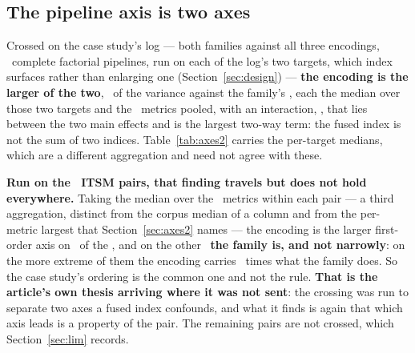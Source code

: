 
\subsection{The pipeline axis is two axes}
\label{app:axes2full}


Crossed on the
case study's log --- both families against all three encodings,
\nCrossedPipelines\ complete factorial pipelines, run on each of the log's two
targets, which index surfaces rather than enlarging one
(Section~\ref{sec:design}) ---
\textbf{the encoding is the larger of the two}, \sEncodingPct\ of the variance
against the family's \sFamilyPct, each the median over those two targets and
the \nInstruments\ metrics pooled, with an interaction,
\sFamilyEncodingPct, that lies between the two main effects and is the largest
two-way term: the fused index is not the sum of two indices.
Table~\ref{tab:axes2} carries the per-target medians, which are a different
aggregation and need not agree with these.

\textbf{Run on the \nItsmCrossed\ ITSM pairs, that finding travels but does
not hold everywhere.} Taking the median over the \nInstruments\ metrics
within each pair --- a third aggregation, distinct from the corpus median of a
column and from the per-metric largest that Section~\ref{sec:axes2} names --- the encoding is the larger first-order axis on
\nEncodingLargerItsm\ of the \nItsmCrossed, and on the other
\nFamilyLargerItsm\ \textbf{the family is, and not narrowly}: on the more
extreme of them the encoding carries \encOverFamItsmMin\ times what the family
does. So the case study's ordering is the common one and not the rule.
\textbf{That is the article's own thesis arriving where it was not sent}: the
crossing was run to separate two axes a fused index confounds, and what it
finds is again that which axis leads is a property of the pair. The remaining
pairs are not crossed, which Section~\ref{sec:lim} records.


